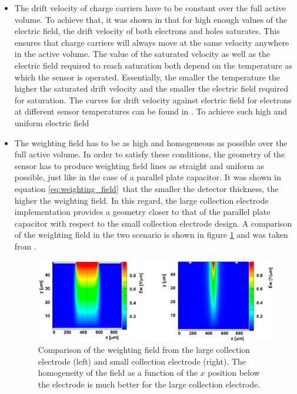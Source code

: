 		\begin{itemize}
			\item The drift velocity of charge carriers have to be constant over the full active volume. To achieve that, it was shown in  that for high enough values of the electric field, the drift velocity of both electrons and holes saturates. This ensures that charge carriers will always move at the same velocity anywhere in the active volume. The value of the saturated velocity as well as the electric field required to reach saturation both depend on the temperature as which the sensor is operated. Essentially, the smaller the temperature the higher the saturated drift velocity and the smaller the electric field required for saturation. The curves for drift velocity against electric field for electrons at different sensor temperatures can be found in \cite{timepix4}. To achieve such high and uniform electric field 
			\item The weighting field has to be as high and homogeneous as possible over the full active volume. In order to satisfy these conditions, the geometry of the sensor has to produce weighting field lines as straight and uniform as possible, just like in the case of a parallel plate capacitor. It was shown in equation \ref{eq:weighting_field} that the smaller the detector thickness, the higher the weighting field. In this regard, the large collection electrode implementation provides a geometry closer to that of the parallel plate capacitor with respect to the small collection electrode design. A comparison of the weighting field in the two scenario is shown in figure \ref{im:weighting_field_simulation} and was taken from \cite{timepix4}.
			\begin{figure}[h]
				\centering
				\includegraphics[width=0.85\linewidth]{files/weighting_field_simulation}
				\caption{Comparison of the weighting field from the large collection electrode (left) and small collection electrode (right). The homogeneity of the field as a function of the $x$ position below the electrode is much better for the large collection electrode. }
				\label{im:weighting_field_simulation}
			\end{figure}
		\end{itemize}
		
